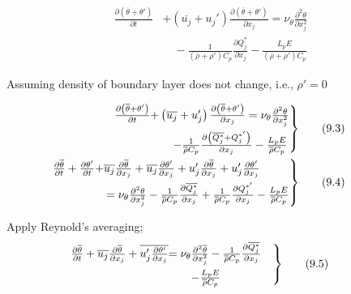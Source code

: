 \documentclass[fleqn,10pt]{SelfArx} %
\begin{document}
\begin{align*}
	\frac{\partial \left(\overline{\theta}+\theta'\right)}{\partial t} &+ \left(\overline{u_j} + u_j'\right)\frac{\partial \left(\overline{\theta} + \theta'\right)}{\partial x_j} = \nu_{\theta}\frac{\partial^2 \theta}{\partial x^2_j} \\ &\quad - \frac{1}{\left(\overline{\rho} + \rho'\right) C_p}\frac{\partial Q_j^*}{\partial x_j} - \frac{L_p E}{\left(\overline{\rho} + \rho'\right) C_p}
\end{align*}

Assuming density of boundary layer does not change, i.e., $\rho' = 0$

\begin{align*}
	\begin{rcases}
		\mspace{-20mu} \frac{\partial \left(\overline{\theta}+\theta'\right)}{\partial t} & \!\!\!\!\!\! + \left(\overline{u_j} + u_j'\right)\frac{\partial \left(\overline{\theta} + \theta'\right)}{\partial x_j} = \nu_{\theta}\frac{\partial^2 \theta}{\partial x^2_j} \\ &\quad - \frac{1}{\overline{\rho} C_p}\frac{\partial \left(\overline{Q_j^*} + Q_j^{*'}\right)}{\partial x_j} - \frac{L_p E}{\overline{\rho} C_p}
	\end{rcases} & \tag{9.3} \label{eq:9.3} \\
	\begin{rcases}
		\mspace{-20mu} \frac{\partial \overline{\theta}}{\partial t} + \frac{\partial \theta'}{\partial t} & \!\!\!\!\!\! + \overline{u_j} \frac{\partial \overline{\theta}}{\partial x_j} + \overline{u_j} \frac{\partial \theta'}{\partial x_j} + u_j' \frac{\partial \overline{\theta}}{\partial x_j} + u_j' \frac{\partial \theta'}{\partial x_j} \\ & = \nu_{\theta} \frac{\partial^2 \theta}{\partial x_j^2} - \frac{1}{\overline{\rho} C_p} \frac{\partial \overline{Q_j^*}}{\partial x_j} + \frac{1}{\overline{\rho} C_p} \frac{\partial Q_j^{*'}}{\partial x_j} - \frac{L_p E}{\overline{\rho} C_p}
	\end{rcases} & \tag{9.4} \label{eq:9.4}
\end{align*}

Apply Reynold's averaging;
\begin{align*}
	\begin{rcases}
		\mspace{-20mu} \frac{\partial \overline{\theta}}{\partial t} + \overline{u_j} \frac{\partial \overline{\theta}}{\partial x_j} + \overline{u_j' \frac{\partial \theta'}{\partial x_j}} & \!\!\!\!\!\! = \nu_{\theta} \frac{\partial^2 \overline{\theta}}{\partial x_j^2} - \frac{1}{\overline{\rho} C_p} \frac{\partial \overline{Q_j^*}}{\partial x_j} \quad \\
		&\quad - \frac{L_p E}{\overline{\rho} C_p}
	\end{rcases} & \tag{9.5} \label{eq:9.5}
\end{align*}
\end{document}
